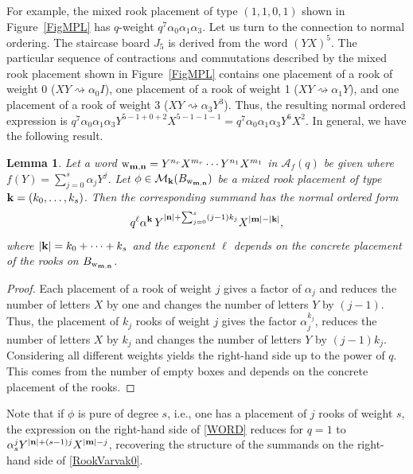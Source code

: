 \documentclass[10pt]{amsart}
\newtheorem{lemma}[theorem]{Lemma}%
\begin{document}
For example, the mixed rook placement of type $(1,1,0,1)$ shown in Figure~\ref{FigMPL} has $q$-weight $q^7 \alpha_0\alpha_1\alpha_3$. Let us turn to the connection to normal ordering. The staircase board $J_5$ is derived from the word $(YX)^5$. The particular sequence of contractions and commutations described by the mixed rook placement shown in Figure~\ref{FigMPL} contains one placement of a rook of weight 0 ($XY \rightsquigarrow \alpha_0 I$), one placement of a rook of weight 1 ($XY \rightsquigarrow \alpha_1Y$), and one placement of a rook of weight 3 ($XY \rightsquigarrow \alpha_3 Y^3$). Thus, the resulting normal ordered expression is $q^7 \alpha_0\alpha_1\alpha_3 Y^{5-1+0+2}X^{5-1-1-1}=q^7 \alpha_0\alpha_1\alpha_3 Y^{6}X^{2}$. In general, we have the following result.
\begin{lemma} Let a word $\mathrm{w}_{{\bf m}, {\bf n}}=Y^{n_r}X^{m_r}\cdots Y^{n_1}X^{m_1}$ in ${\mathcal A}_f(q)$ be given where $f(Y)=\sum_{j=0}^s \alpha_jY^j$. Let $\phi \in {\mathcal M}_{{\bf k}}(B_{\mathrm{w}_{{\bf m}, {\bf n}}})$ be a mixed rook placement of type ${\bf k}=(k_0,\ldots,k_s)$. Then the corresponding summand has the normal ordered form
\begin{equation}\label{WORD}
q^{\ell} {\bf  \alpha}^{{\bf k}} \, Y^{|{\bf n}|+\sum_{j=0}^s (j-1)k_j}X^{|{\bf m}|-|{\bf k}|},
\end{equation}
where $|{\bf k}|=k_0 +\cdots + k_s$ and the exponent $\ell$ depends on the concrete placement of the rooks on $B_{\mathrm{w}_{{\bf m}, {\bf n}}}$.
\end{lemma}
\begin{proof}
Each placement of a rook of weight $j$ gives a factor of $\alpha_j$ and reduces the number of letters $X$ by one and changes the number of letters $Y$ by $(j-1)$. Thus, the placement of $k_j$ rooks of weight $j$ gives the factor $\alpha_j^{k_j}$, reduces the number of letters $X$ by $k_j$ and changes the number of letters $Y$ by $(j-1)k_j$. Considering all different weights yields the right-hand side up to the power of $q$. This comes from the number of empty boxes and depends on the concrete placement of the rooks.  
\end{proof}
Note that if $\phi$ is pure of degree $s$, i.e., one has a placement of $j$ rooks of weight $s$, the expression on the right-hand side of \eqref{WORD} reduces  for $q=1$ to $\alpha_s^{j} Y^{|{\bf n}|+(s-1)j}X^{|{\bf m}|-j}$, recovering the structure of the summands on the right-hand side of \eqref{RookVarvak0}.  
\end{document}

